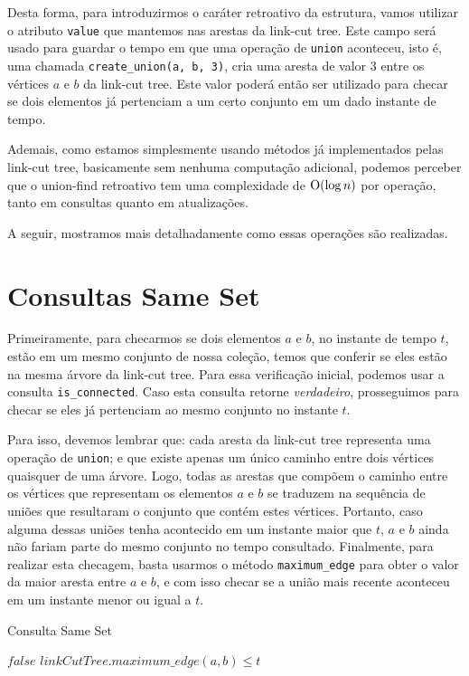 Desta forma, para introduzirmos o caráter retroativo da estrutura, vamos utilizar o atributo \texttt{value} que mantemos nas arestas da link-cut tree. Este campo será usado para guardar o tempo em que uma operação de \texttt{union} aconteceu, isto é, uma chamada \texttt{create\_union(a, b, 3)}, cria uma aresta de valor $3$ entre os vértices $a$ e $b$ da link-cut tree. Este valor poderá então ser utilizado para checar se dois elementos já pertenciam a um certo conjunto em um dado instante de tempo.

Ademais, como estamos simplesmente usando métodos já implementados pelas link-cut tree, basicamente sem nenhuma computação adicional, podemos perceber que o union-find retroativo tem uma complexidade de $\mathrm{O}(\log n)$ por operação, tanto em consultas quanto em atualizações.

A seguir, mostramos mais detalhadamente como essas operações são realizadas.

\section{Consultas Same Set}
\label{sec:uf-same-set}

Primeiramente, para checarmos se dois elementos $a$ e $b$, no instante de tempo $t$, estão em um mesmo conjunto de nossa coleção, temos que conferir se eles estão na mesma árvore da link-cut tree. Para essa verificação inicial, podemos usar a consulta \texttt{is\_connected}. Caso esta consulta retorne \emph{verdadeiro}, prosseguimos para checar se eles já pertenciam ao mesmo conjunto no instante $t$.

Para isso, devemos lembrar que: cada aresta da link-cut tree representa uma operação de \texttt{union}; e que existe apenas um único caminho entre dois vértices quaisquer de uma árvore. Logo, todas as arestas que compõem o caminho entre os vértices que representam os elementos $a$ e $b$ se traduzem na sequência de uniões que resultaram o conjunto que contém estes vértices. Portanto, caso alguma dessas uniões tenha acontecido em um instante maior que $t$, $a$ e $b$ ainda não fariam parte do mesmo conjunto no tempo consultado. Finalmente, para realizar esta checagem, basta usarmos o método \texttt{maximum\_edge} para obter o valor da maior aresta entre $a$ e $b$, e com isso checar se a união mais recente aconteceu em um instante menor ou igual a $t$.

\begin{algorithm}[h!]
    \caption{Consulta Same Set}\label{uf:same-set}
    \begin{algorithmic}
        \State \Return $false$
        \EndIf
        \State \Return $linkCutTree.maximum\_edge(a, b) \leq t$
        \EndFunction
    \end{algorithmic}
\end{algorithm}

